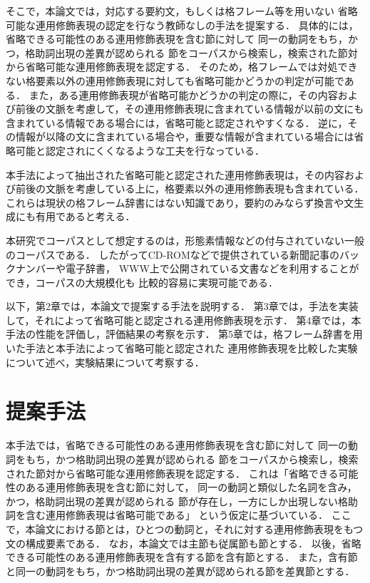 そこで，本論文では，対応する要約文，もしくは格フレーム等を用いない
省略可能な連用修飾表現の認定を行なう教師なしの手法を提案する．
具体的には，省略できる可能性のある連用修飾表現を含む節に対して
同一の動詞をもち，かつ，格助詞出現の差異が認められる
節をコーパスから検索し，検索された節対から省略可能な連用修飾表現を認定する．
そのため，格フレームでは対処できない格要素以外の連用修飾表現に対しても省略可能かどうかの判定が可能である．
また，ある連用修飾表現が省略可能かどうかの判定の際に，その内容および前後の文脈を考慮して，その連用修飾表現に含まれている情報が以前の文にも含まれている情報である場合には，省略可能と認定されやすくなる．
逆に，その情報が以降の文に含まれている場合や，重要な情報が含まれている場合には省略可能と認定されにくくなるような工夫を行なっている．


本手法によって抽出された省略可能と認定された連用修飾表現は，その内容および前後の文脈を考慮している上に，格要素以外の連用修飾表現も含まれている．これらは現状の格フレーム辞書にはない知識であり，要約のみならず換言や文生成にも有用であると考える．


本研究でコーパスとして想定するのは，形態素情報などの付与されていない一般
のコーパスである．
したがってCD-ROMなどで提供されている新聞記事のバックナンバーや電子辞書，
WWW上で公開されている文書などを利用することができ，コーパスの大規模化も
比較的容易に実現可能である．

以下，第2章では，本論文で提案する手法を説明する．
第3章では，手法を実装して，それによって省略可能と認定される連用修飾表現を示す．
第4章では，本手法の性能を評価し，評価結果の考察を示す．
第5章では，格フレーム辞書を用いた手法と本手法によって省略可能と認定された
連用修飾表現を比較した実験について述べ，実験結果について考察する．
\section{提案手法}
本手法では，省略できる可能性のある連用修飾表現を含む節に対して
同一の動詞をもち，かつ格助詞出現の差異が認められる
節をコーパスから検索し，検索された節対から省略可能な連用修飾表現を認定する．
これは「省略できる可能性のある連用修飾表現を含む節に対して，
同一の動詞と類似した名詞を含み，かつ，格助詞出現の差異が認められる
節が存在し，一方にしか出現しない格助詞を含む連用修飾表現は省略可能である」
という仮定に基づいている．
ここで，本論文における節とは，ひとつの動詞と，それに対する連用修飾表現をもつ文の構成要素である．
なお，本論文では主節も従属節も節とする．
以後，省略できる可能性のある連用修飾表現を含有する節を含有節とする．
また，含有節と同一の動詞をもち，かつ格助詞出現の差異が認められる節を差異節とする．
